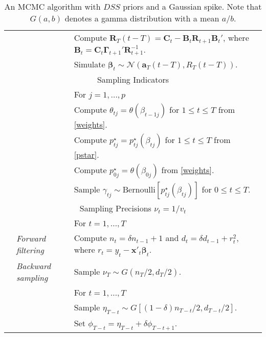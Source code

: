 \documentclass[ba]{imsart}
\numberwithin{equation}{section}
\theoremstyle{plain}
\def\bG{\bm{\Gamma}}
\def\b{\mbox{\boldmath$b$}}
\newcommand{\bm}[1]{\boldsymbol{#1}}
\def\b{\bm{\beta}}
\begin{document}
{{\begin{table}[!t]
\begin{center}
{\begin{tabular}{|lll|}
& &  Compute $\bm R_T(t-T)=\bm C_t-\bm B_t\bm R_{t+1}\bm B_t'$, where $\bm B_t=\bm C_t\bG_{t+1}'\bm R_{t+1}^{-1}$. \\
& &  Simulate $\b_t\sim\mathcal{N}(\bm a_T(t-T),R_T(t-T))$.\\
\multicolumn{3}{|c|}{\cellcolor[HTML]{C0C0C0}Sampling Indicators}    \\
& & For $j=1,\dots, p$                                              \\
             &           & Compute $\theta_{tj}=\theta(\beta_{t-1j}) $ for $1\leq t\leq T$ from \eqref{weights}.                                             \\ 
& & Compute $p^\star_{tj}=p^\star_{tj}(\beta_{tj})$ for $1\leq t\leq T$  from \eqref{pstar}. \\
& & Compute $p^\star_{0j}=\theta(\beta_{0j})$   from \eqref{weights}. \\
& & Sample $\gamma_{tj}\sim\mathrm{Bernoulli}[p^\star_{tj}(\beta_{tj})]$ for $0\leq t\leq T$. \\
\multicolumn{3}{|c|}{\cellcolor[HTML]{C0C0C0}Sampling Precisions $\nu_t=1/v_t$}    \\
& & For $t=1,\dots, T$                                              \\
&  \em Forward filtering       & Compute $n_t=\delta n_{t-1}+1$ and $d_t=\delta d_{t-1}+r_t^2$, where $r_t=y_t-\bm x'_t\b_t$.\\
&  \em Backward sampling  & Sample $\nu_T\sim G(n_T/2,d_T/2)$.\\
& & For $t=1,\dots, T$    	\\
& & Sample $\eta_{T-t}\sim G[(1-\delta)n_{T-t}/2,d_{T-t}/2]$.\\
&& Set $\phi_{T-t}=\eta_{T-t}+\delta\phi_{T-t+1}.$\\
\hline\hline 
\end{tabular}}
\end{center}
\caption{\small An MCMC algorithm with $DSS$ priors and a Gaussian spike. Note that $G(a,b)$ denotes a gamma distribution with a mean $a/b$.}
\label{EM}
\end{table}


}}
\end{document}
